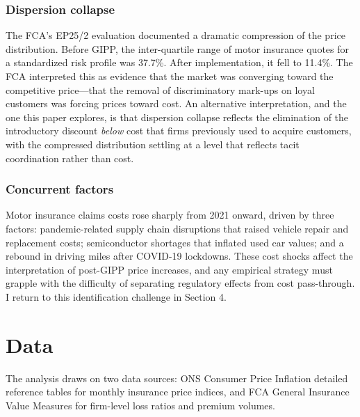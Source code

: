 \documentclass[12pt]{article}
\begin{document}
\subsubsection*{Dispersion collapse} The FCA's EP25/2 evaluation documented a dramatic compression of the price distribution. Before GIPP, the inter-quartile range of motor insurance quotes for a standardized risk profile was 37.7\%. After implementation, it fell to 11.4\%. The FCA interpreted this as evidence that the market was converging toward the competitive price---that the removal of discriminatory mark-ups on loyal customers was forcing prices toward cost. An alternative interpretation, and the one this paper explores, is that dispersion collapse reflects the elimination of the introductory discount \textit{below} cost that firms previously used to acquire customers, with the compressed distribution settling at a level that reflects tacit coordination rather than cost.

\subsubsection*{Concurrent factors} Motor insurance claims costs rose sharply from 2021 onward, driven by three factors: pandemic-related supply chain disruptions that raised vehicle repair and replacement costs; semiconductor shortages that inflated used car values; and a rebound in driving miles after COVID-19 lockdowns. These cost shocks affect the interpretation of post-GIPP price increases, and any empirical strategy must grapple with the difficulty of separating regulatory effects from cost pass-through. I return to this identification challenge in Section 4.


\section{Data}

The analysis draws on two data sources: ONS Consumer Price Inflation detailed reference tables for monthly insurance price indices, and FCA General Insurance Value Measures for firm-level loss ratios and premium volumes.
\end{document}
